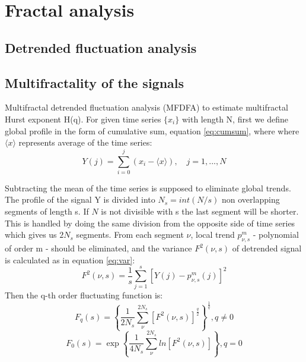 
\section{Fractal analysis}

\subsection{Detrended fluctuation analysis}

\subsection{Multifractality of the signals}

Multifractal detrended fluctuation analysis (MFDFA) \cite{kantelhardt2002, ihlen2012} to estimate multifractal Hurst exponent H(q). For given time series $\{x_i\}$ with length N, first we define global profile in the form of cumulative sum, equation \ref{eq:cumsum}, where where $\langle x\rangle $ represents average of the time series:
\begin{equation}
Y(j) = \sum_{i=0} ^j (x_i - \langle x\rangle), \quad j=1, ..., N
\label{eq:cumsum}
\end{equation}

Subtracting the mean of the time series is supposed to eliminate global trends. The profile of the signal Y is divided into $N_s = int (N/s)$ non overlapping segments of length s. If $N$ is not divisible with s the last segment will be shorter. This is handled by doing the same division from the opposite side of time series which gives us $2N_s$ segments. From each segment $\nu$, local trend $p^m_{\nu, s}$ - polynomial of order m - should be eliminated, and the variance $F^2(\nu, s)$ of detrended signal is calculated as in equation \ref{eq:var}:
\begin{equation}
F^2(\nu, s) = \frac{1}{s}\sum_{j=1}^s \left[Y(j) - p^m_{\nu, s}(j)\right]^2
\label{eq:var}
\end{equation}
Then the q-th order fluctuating function is: 
\begin{equation}
F_q(s) = \left\{\frac{1}{2N_s}\sum_{\nu}^{2N_s}\left[F^2(\nu, s)\right]^{\frac{q}{2}}\right\}^{\frac{1}{q}},  q \neq 0 \nonumber
\end{equation}
\begin{equation}
F_0(s) = \exp \left\{\frac{1}{4N_s}\sum_{\nu}^{2N_s}ln \left[F^2(\nu, s)\right]\right\}, q=0
\end{equation}

